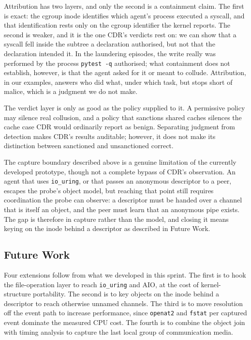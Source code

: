 \documentclass[11pt]{article}
\begin{document}
Attribution has two layers, and only the second is a containment claim. The first is
exact: the cgroup inode identifies which agent's process executed a syscall, and that
identification rests only on the cgroup identifier the kernel reports. The second is
weaker, and it is the one CDR's verdicts rest on: we can show that a syscall fell inside
the subtree a declaration authorised, but not that the declaration intended it. In the
laundering episodes, the write really was performed by the process \texttt{pytest -q}
authorised; what containment does not establish, however, is that the agent asked for it
or meant to collude. Attribution, in our examples, answers who did what, under which
task, but stops short of malice, which is a judgment we do not make.

The verdict layer is only as good as the policy supplied to it. A permissive policy may
silence real collusion, and a policy that sanctions shared caches silences the cache
case CDR would ordinarily report as benign. Separating judgment from detection makes
CDR's results auditable; however, it does not make its distinction between sanctioned
and unsanctioned correct.

The capture boundary described above is a genuine limitation of the currently developed
prototype, though not a complete bypass of CDR's observation. An agent that uses
\texttt{io\_uring}, or that passes an anonymous descriptor to a peer, escapes the
probe's object model, but reaching that point still requires coordination the probe can
observe: a descriptor must be handed over a channel that is itself an object, and the
peer must learn that an anonymous pipe exists. The gap is therefore in capture rather
than the model, and closing it means keying on the inode behind a descriptor as
described in Future Work.

\subsection*{Future Work}

Four extensions follow from what we developed in this sprint. The first is to hook the
file-operation layer to reach \texttt{io\_uring} and AIO, at the cost of kernel-structure
portability. The second is to key objects on the inode behind a descriptor to reach
otherwise unnamed channels. The third is to move resolution off the event path to
increase performance, since \texttt{openat2} and \texttt{fstat} per captured event
dominate the measured CPU cost. The fourth is to combine the object join with timing
analysis to capture the last local group of communication media.
\end{document}
